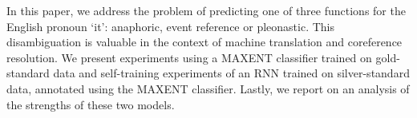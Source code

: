 In this paper, we address the problem of predicting one of three functions for the English pronoun `it': anaphoric, event reference or pleonastic. This disambiguation is valuable in the context of machine translation and coreference resolution. We present experiments using a MAXENT classifier trained on gold-standard data and self-training experiments of an RNN trained on silver-standard data, annotated using the MAXENT classifier. Lastly, we report on an analysis of the strengths of these two models.

